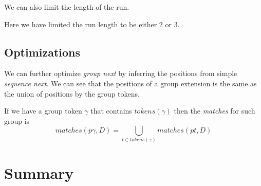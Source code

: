 \begin{figure}[H]
	
\end{figure}

We can also limit the length of the run.

\begin{figure}[H]
	
\end{figure}

Here we have limited the run length to be either 2 or 3.

\subsection{Optimizations}

We can further optimize \emph{group next} by inferring the positions from simple \emph{sequence next}. We can see that the positions of a group extension is the same as the union of positions by the group tokens.

If we have a group token $\gamma$ that contains $tokens(\gamma)$ then the \emph{matches} for such group is $$matches(p\gamma, D) = \bigcup_{t \in tokens(\gamma)} matches(pt, D) $$


\section{Summary}

